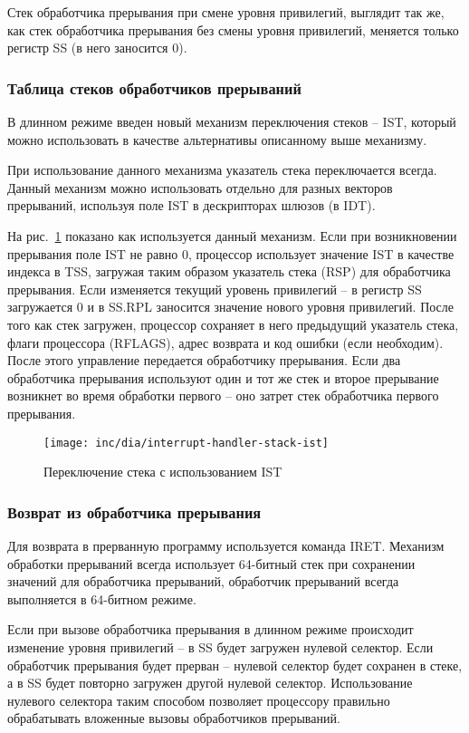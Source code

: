 Стек обработчика прерывания при смене уровня привилегий, выглядит так же, как
стек обработчика прерывания без смены уровня привилегий, меняется только
регистр SS (в него заносится 0).

\subsubsection*{Таблица стеков обработчиков прерываний}
В длинном режиме введен новый механизм переключения стеков -- IST, который
можно использовать в качестве альтернативы описанному выше механизму.

При использование данного механизма указатель стека переключается всегда. Данный механизм
можно использовать отдельно для разных векторов прерываний, используя поле IST
в дескрипторах шлюзов (в IDT).

На рис.~\ref{fig:interrupt_handler_stack_ist} показано как используется данный
механизм. Если при возникновении прерывания поле IST не равно 0, процессор
использует значение IST в качестве индекса в TSS, загружая таким образом указатель стека
(RSP) для обработчика прерывания. Если изменяется текущий уровень привилегий
-- в регистр SS загружается 0 и в SS.RPL заносится значение нового уровня
привилегий. После того как стек загружен, процессор сохраняет в него предыдущий
указатель стека, флаги процессора (RFLAGS), адрес возврата и код ошибки (если
необходим). После этого управление передается обработчику прерывания. Если два
обработчика прерывания используют один и тот же стек и второе прерывание
возникнет во время обработки первого -- оно затрет стек обработчика первого прерывания.

\begin{figure}[ht!]
  \centering
  \texttt{[image: inc/dia/interrupt-handler-stack-ist]}
  \caption{Переключение стека с использованием IST}
  \label{fig:interrupt_handler_stack_ist}
\end{figure}

\subsubsection*{Возврат из обработчика прерывания}
Для возврата в прерванную программу используется команда IRET. Механизм
обработки прерываний всегда использует 64-битный стек при сохранении значений
для обработчика прерываний, обработчик прерываний всегда выполняется в
64-битном режиме.

Если при вызове обработчика прерывания в длинном режиме происходит изменение
уровня привилегий -- в SS будет загружен нулевой селектор. Если обработчик
прерывания будет прерван -- нулевой селектор будет сохранен в стеке, а в SS
будет повторно загружен другой нулевой селектор. Использование нулевого
селектора таким способом позволяет процессору правильно обрабатывать вложенные
вызовы обработчиков прерываний.

